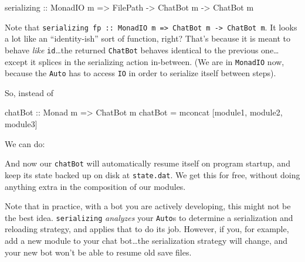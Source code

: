 \documentclass[]{article}
\newenvironment{Shaded}{}{}
\newcommand{\DataTypeTok}[1]{\textcolor[rgb]{0.56,0.13,0.00}{#1}}
\newcommand{\FunctionTok}[1]{\textcolor[rgb]{0.02,0.16,0.49}{#1}}
\newcommand{\NormalTok}[1]{#1}
\newcommand{\OperatorTok}[1]{\textcolor[rgb]{0.40,0.40,0.40}{#1}}
\newcommand{\OtherTok}[1]{\textcolor[rgb]{0.00,0.44,0.13}{#1}}
\newcommand{\StringTok}[1]{\textcolor[rgb]{0.25,0.44,0.63}{#1}}
\begin{document}
\begin{Shaded}
\begin{Highlighting}[]
\OtherTok{serializing\textquotesingle{} ::} \DataTypeTok{MonadIO}\NormalTok{ m }\OtherTok{=\textgreater{}} \DataTypeTok{FilePath} \OtherTok{{-}\textgreater{}} \DataTypeTok{ChatBot}\NormalTok{ m }\OtherTok{{-}\textgreater{}} \DataTypeTok{ChatBot}\NormalTok{ m}
\end{Highlighting}
\end{Shaded}

Note that
\texttt{serializing\textquotesingle{}\ fp\ ::\ MonadIO\ m\ =\textgreater{}\ ChatBot\ m\ -\textgreater{}\ ChatBot\ m}.
It looks a lot like an ``identity-ish'' sort of function, right? That's because
it is meant to behave \emph{like} \texttt{id}\ldots the returned
\texttt{ChatBot} behaves identical to the previous one\ldots except it splices
in the serializing action in-between. (We are in \texttt{MonadIO} now, because
the \texttt{Auto} has to access \texttt{IO} in order to serialize itself between
steps).

So, instead of

\begin{Shaded}
\begin{Highlighting}[]
\OtherTok{chatBot ::} \DataTypeTok{Monad}\NormalTok{ m }\OtherTok{=\textgreater{}} \DataTypeTok{ChatBot}\NormalTok{ m}
\NormalTok{chatBot }\OtherTok{=} \FunctionTok{mconcat}\NormalTok{ [module1, module2, module3]}
\end{Highlighting}
\end{Shaded}

We can do:

\begin{Shaded}
\end{Shaded}

And now our \texttt{chatBot} will automatically resume itself on program
startup, and keep its state backed up on disk at \texttt{state.dat}. We get this
for free, without doing anything extra in the composition of our modules.

Note that in practice, with a bot you are actively developing, this might not be
the best idea. \texttt{serializing\textquotesingle{}} \emph{analyzes} your
\texttt{Auto}s to determine a serialization and reloading strategy, and applies
that to do its job. However, if you, for example, add a new module to your chat
bot\ldots the serialization strategy will change, and your new bot won't be able
to resume old save files.
\end{document}
